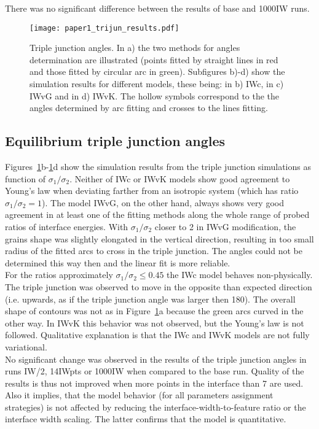 There was no significant difference between the results of base and 1000IW runs.


\begin{figure}[]
	\centering
	\texttt{[image: paper1\_trijun\_results.pdf]}
	\caption[Results - models comparison in triple junction angles benchmark]{Triple junction angles. In a) the two methods for angles determination are illustrated (points fitted by straight lines in red and those fitted by circular arc in green). Subfigures b)-d) show the simulation results for different models, these being: in b) IWc, in c) IWvG and in d) IWvK. The hollow symbols correspond to the the angles determined by arc fitting and crosses to the lines fitting.}
	\label{fig_trijunang_results}
\end{figure}


\subsection{Equilibrium triple junction angles}\label{subsec_paper1_results_trijun}
Figures~\ref{fig_trijunang_results}b-\ref{fig_trijunang_results}d show the simulation results from the triple junction simulations as function of $\sigma_1/\sigma_2$. Neither of IWc or IWvK models show good agreement to Young's law when deviating farther from an isotropic system (which has ratio $\sigma_1/\sigma_2=1$). The model IWvG, on the other hand, always shows very good agreement in at least one of the fitting methods along the whole range of probed ratios of interface energies. With $\sigma_1/\sigma_2$ closer to 2 in IWvG modification, the grains shape was slightly elongated in the vertical direction, resulting in too small radius of the fitted arcs to cross in the triple junction. The angles could not be determined this way then and the linear fit is more reliable. \\
For the ratios approximately $\sigma_1/\sigma_2\leq0.45$ the IWc model behaves non-physically. The triple junction was observed to move in the opposite than expected direction (i.e. upwards, as if the triple junction angle was larger then 180\textdegree). The overall shape of contours was not as in Figure~\ref{fig_trijunang_results}a because the green arcs curved in the other way. In IWvK this behavior was not observed, but the Young's law is not followed. Qualitative explanation is that the IWc and IWvK models are not fully variational. \\
No significant change was observed in the results of the triple junction angles in runs IW/2, 14IWpts or 1000IW when compared to the base run. Quality of the results is thus not improved when more points in the interface than 7 are used. Also it implies, that the model behavior (for all parameters assignment strategies) is not affected by reducing the interface-width-to-feature ratio or the interface width scaling. The latter confirms that the model is quantitative.

